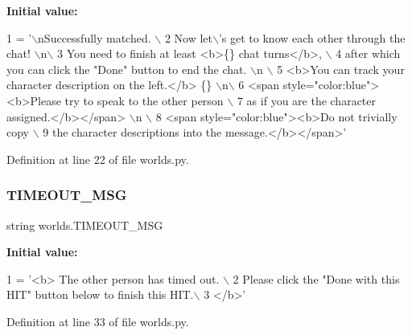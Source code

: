 {\bfseries Initial value\+:}
\begin{DoxyCode}
1 =  \textcolor{stringliteral}{'\(\backslash\)nSuccessfully matched. \(\backslash\)}
2 \textcolor{stringliteral}{        Now let\(\backslash\)'s get to know each other through the chat! \(\backslash\)n\(\backslash\)}
3 \textcolor{stringliteral}{        You need to finish at least <b>\{\} chat turns</b>, \(\backslash\)}
4 \textcolor{stringliteral}{        after which you can click the "Done" button to end the chat. \(\backslash\)n \(\backslash\)}
5 \textcolor{stringliteral}{        <b>You can track your character description on the left.</b> \{\} \(\backslash\)n\(\backslash\)}
6 \textcolor{stringliteral}{        <span style="color:blue"><b>Please try to speak to the other person \(\backslash\)}
7 \textcolor{stringliteral}{        as if you are the character assigned.</b></span> \(\backslash\)n \(\backslash\)}
8 \textcolor{stringliteral}{        <span style="color:blue"><b>Do not trivially copy \(\backslash\)}
9 \textcolor{stringliteral}{        the character descriptions into the message.</b></span>'}
\end{DoxyCode}


Definition at line 22 of file worlds.\+py.

\mbox{\label{namespaceworlds_a4caefb117b7b7109a5d6372d69593068}} 
\subsubsection{\texorpdfstring{T\+I\+M\+E\+O\+U\+T\+\_\+\+M\+SG}{TIMEOUT\_MSG}}
{\footnotesize\ttfamily string worlds.\+T\+I\+M\+E\+O\+U\+T\+\_\+\+M\+SG}

{\bfseries Initial value\+:}
\begin{DoxyCode}
1 =  \textcolor{stringliteral}{'<b> The other person has timed out. \(\backslash\)}
2 \textcolor{stringliteral}{        Please click the "Done with this HIT" button below to finish this HIT.\(\backslash\)}
3 \textcolor{stringliteral}{        </b>'}
\end{DoxyCode}


Definition at line 33 of file worlds.\+py.

\mbox{\label{namespaceworlds_ac3bfe2941369975e9eacad114bc813fb}} 
